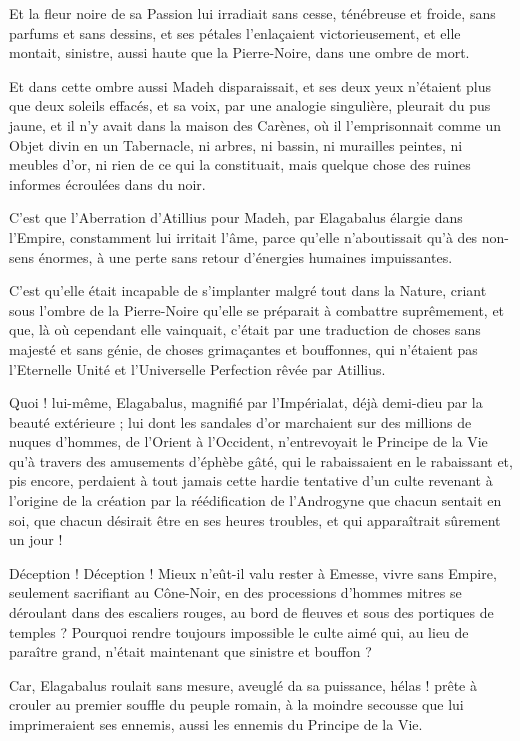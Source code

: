 \documentclass[a4paper, 11pt, oneside, polutonikogreek, french]{article}
\begin{document}
Et la fleur noire de sa Passion lui irradiait sans cesse, ténébreuse et froide, sans parfums et sans dessins, et ses pétales l'enlaçaient victorieusement, et elle montait, sinistre, aussi haute que la Pierre-Noire, dans une ombre de mort.

Et dans cette ombre aussi Madeh disparaissait, et ses deux yeux n'étaient plus que deux soleils effacés, et sa voix, par une analogie singulière, pleurait du pus jaune, et il n'y avait dans la maison des Carènes, où il l'emprisonnait comme un Objet divin en un Tabernacle, ni arbres, ni bassin, ni murailles peintes, ni meubles d'or, ni rien de ce qui la constituait, mais quelque chose des ruines informes écroulées dans du noir.

C'est que l'Aberration d'Atillius pour Madeh, par Elagabalus élargie dans l'Empire, constamment lui irritait l'âme, parce qu'elle n'aboutissait qu'à des non-sens énormes, à une perte sans retour d'énergies humaines impuissantes.

C'est qu'elle était incapable de s'implanter malgré tout dans la Nature, criant sous l'ombre de la Pierre-Noire qu'elle se préparait à combattre suprêmement, et que, là où cependant elle vainquait, c'était par une traduction de choses sans majesté et sans génie, de choses grimaçantes et bouffonnes, qui n'étaient pas l'Eternelle Unité et l'Universelle Perfection rêvée par Atillius.

Quoi ! lui-même, Elagabalus, magnifié par l'Impérialat, déjà demi-dieu par la beauté extérieure ; lui dont les sandales d'or marchaient sur des millions de nuques d'hommes, de l'Orient à l'Occident, n'entrevoyait le Principe de la Vie qu'à travers des amusements d'éphèbe gâté, qui le rabaissaient en le rabaissant et, pis encore, perdaient à tout jamais cette hardie tentative d'un culte revenant à l'origine de la création par la réédification de l'Androgyne que chacun sentait en soi, que chacun désirait être en ses heures troubles, et qui apparaîtrait sûrement un jour !

Déception ! Déception ! Mieux n'eût-il valu rester à Emesse, vivre sans Empire, seulement sacrifiant au Cône-Noir, en des processions d'hommes mitres se déroulant dans des escaliers rouges, au bord de fleuves et sous des portiques de temples ? Pourquoi rendre toujours impossible le culte aimé qui, au lieu de paraître grand, n'était maintenant que sinistre et bouffon ?

Car, Elagabalus roulait sans mesure, aveuglé da sa puissance, hélas ! prête à crouler au premier souffle du peuple romain, à la moindre secousse que lui imprimeraient ses ennemis, aussi les ennemis du Principe de la Vie.
\end{document}
